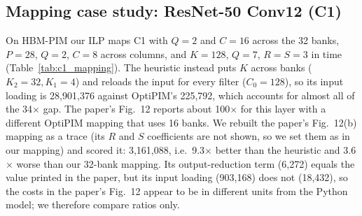 \documentclass[conference]{IEEEtran}
\begin{document}
\subsection{Mapping case study: ResNet-50 Conv12 (C1)}
On HBM-PIM our ILP maps C1 with $Q{=}2$ and $C{=}16$ across the 32 banks,
$P{=}28$, $Q{=}2$, $C{=}8$ across columns, and $K{=}128$, $Q{=}7$, $R{=}S{=}3$
in time (Table~\ref{tab:c1_mapping}). The heuristic instead puts $K$ across banks ($K_2{=}32, K_1{=}4$) and reloads the input for
every filter ($C_0{=}128$), so its input loading is 28{,}901{,}376 against OptiPIM's
225{,}792, which accounts for almost all of the 34$\times$ gap. The paper's
Fig.~12 reports about 100$\times$ for this layer with a different OptiPIM
mapping that uses 16 banks. We rebuilt the paper's Fig.~12(b) mapping as a trace
(its $R$ and $S$ coefficients are not shown, so we set them as in our
mapping) and scored it: 3{,}161{,}088, i.e.\ 9.3$\times$ better than the
heuristic and 3.6$\times$ worse than our 32-bank mapping. Its output-reduction
term (6{,}272) equals the value printed in the paper, but its input loading
(903{,}168) does not (18{,}432), so the costs in the paper's Fig.~12 appear to be
in different units from the Python model; we therefore compare ratios only.

\begin{table}[t]
\centering
\caption{C1 (ResNet-50 Conv12) Loop Split Factors: OptiPIM vs.\ Heuristic}
\label{tab:c1_mapping}
\footnotesize
\setlength{\tabcolsep}{3pt}
\end{table}
\end{document}
